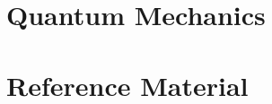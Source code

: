 \documentclass[10pt,letterpaper,final,twoside,notitlepage]{article}
\numberwithin{equation}{section} %
\theoremstyle{definition}
\theoremstyle{remark}
\begin{document}
\section{Quantum Mechanics} \label{sec:Quantum Mech}

\appendix
\section{Reference Material} \label{sec:Reference Material}



\end{document}
